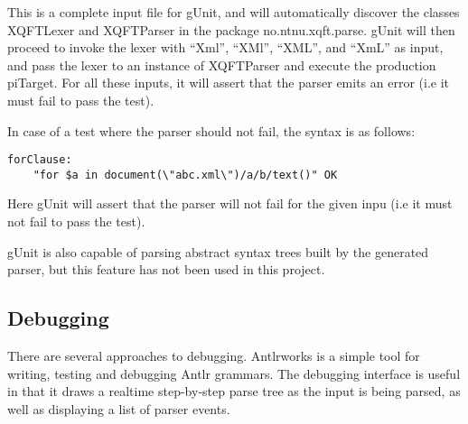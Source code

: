 This is a complete input file for gUnit, and will automatically discover the
classes XQFTLexer and XQFTParser in the package no.ntnu.xqft.parse. gUnit will
then proceed to invoke the lexer with ``Xml'', ``XMl'', ``XML'', and ``XmL'' as
input, and pass the lexer to an instance of XQFTParser and execute the production
piTarget. For all these inputs, it will assert that the parser emits an error
(i.e it must fail to pass the test).

In case of a test where the parser should not fail, the syntax is as follows:
\begin{verbatim}
forClause:
	"for $a in document(\"abc.xml\")/a/b/text()" OK
\end{verbatim}
Here gUnit will assert that the parser will not fail for the given inpu (i.e it
must not fail to pass the test).

gUnit is also capable of parsing abstract syntax trees built by the generated
parser, but this feature has not been used in this project.

\subsection{Debugging}
There are several approaches to debugging. Antlrworks \cite{antlrwrks00} is a
simple tool for writing, testing and debugging Antlr grammars. The debugging
interface is useful in that it draws a realtime step-by-step parse tree as the
input is being parsed, as well as displaying a list of parser events.
